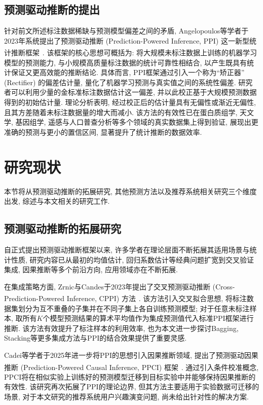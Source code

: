 \documentclass[a4paper, AutoFakeBold, UTF8]{ctexrep}
\theoremstyle{plain}
\newcommand{\upcite}[1]
{\textsuperscript{~\cite{#1}}}
\numberwithin{equation}{chapter}
\begin{document}
\subsection{预测驱动推断的提出}

针对前文所述标注数据稀缺与预测模型偏差之间的矛盾, Angelopoulos等学者于2023年系统提出了预测驱动推断 (Prediction-Powered Inference, PPI) 这一新型统计推断框架\upcite{Angelopoulos2023}. 该框架的核心思想可概括为: 将大规模未标注数据上训练的机器学习模型的预测能力, 与小规模高质量标注数据的统计可靠性相结合, 以产生既具有统计保证又更高效能的推断结论. 具体而言, PPI框架通过引入一个称为``矫正器'' (Rectifier) 的偏差估计量, 量化了机器学习预测与真实值之间的系统性偏差. 研究者可以利用少量的金标准标注数据估计这一偏差, 并以此校正基于大规模预测数据得到的初始估计量. 理论分析表明, 经过校正后的估计量具有无偏性或渐近无偏性, 且其方差随着未标注数据量的增大而减小. 该方法的有效性已在蛋白质组学, 天文学, 基因组学, 遥感与人口普查分析等多个领域的真实数据集上得到验证, 展现出更准确的预测与更小的置信区间, 显著提升了统计推断的数据效率. 

\section{研究现状}

本节将从预测驱动推断的拓展研究, 其他预测方法以及推荐系统相关研究三个维度出发, 综述与本文相关的研究工作. 

\subsection{预测驱动推断的拓展研究}

自正式提出预测驱动推断框架以来, 许多学者在理论层面不断拓展其适用场景与统计性质, 研究内容已从最初的均值估计, 回归系数估计等经典问题扩宽到交叉验证集成, 因果推断等多个前沿方向, 应用领域亦在不断拓展. 

在集成策略方面, Zrnic与Candes于2023年提出了交叉预测驱动推断 (Cross-Prediction-Powered Inference, CPPI) 方法\upcite{Zrnic2023}. 该方法引入交叉拟合思想, 将标注数据集划分为互不重叠的子集并在不同子集上各自训练预测模型; 对于任意未标注样本, 取所有$K$个模型预测结果的算术平均值作为集成预测值代入标准PPI框架进行推断. 该方法有效提升了标注样本的利用效率, 也为本文进一步探讨Bagging, Stacking等更多集成方法与PPI的结合效果提供了重要灵感. 

Cadei等学者于2025年进一步将PPI的思想引入因果推断领域, 提出了预测驱动因果推断 (Prediction-Powered Causal Inference, PPCI) 框架\upcite{Cadei2025}. 通过引入条件校准概念, PPCI将在相似实验上训练好的预测模型迁移到目标实验中并能够保持因果推断的有效性. 该研究再次拓展了PPI的理论边界, 但其方法主要适用于实验数据可迁移的场景, 对于本文研究的推荐系统用户兴趣演变问题, 尚未给出针对性的解决方案. 
\end{document}
